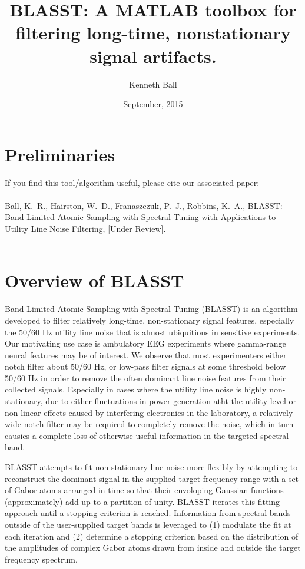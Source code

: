 \documentclass[11pt]{article}
\title{BLASST: A MATLAB toolbox for filtering long-time, nonstationary signal artifacts.}
\author{Kenneth Ball}
\date{September, 2015}
\theoremstyle{remark}
\begin{document}
\maketitle

\section*{Preliminaries}
If you find this tool/algorithm useful, please cite our associated paper: \\ \ \\

\noindent Ball, K.~R., Hairston, W.~D., Franaszczuk, P.~J., Robbins, K.~A., BLASST: Band Limited Atomic Sampling with Spectral Tuning with Applications to Utility Line Noise Filtering, [Under Review]. \\ \ \\

\section{Overview of BLASST}
Band Limited Atomic Sampling with Spectral Tuning (BLASST) is an algorithm developed to filter relatively long-time, non-stationary signal features, especially the 50/60 Hz utility line noise that is almost ubiquitious in sensitive experiments. Our motivating use case is ambulatory EEG experiments where gamma-range neural features may be of interest. We observe that most experimenters either notch filter about 50/60 Hz, or low-pass filter signals at some threshold below 50/60 Hz in order to remove the often dominant line noise features from their collected signals. Especially in cases where the utility line noise is highly non-stationary, due to either fluctuations in power generation atht the utility level or non-linear effects caused by interfering electronics in the laboratory, a relatively wide notch-filter may be required to completely remove the noise, which in turn causies a complete loss of otherwise useful information in the targeted spectral band.

BLASST attempts to fit non-stationary line-noise more flexibly by attempting to reconstruct the dominant signal in the supplied target frequency range with a set of Gabor atoms arranged in time so that their envoloping Gaussian functions (approximately) add up to a partition of unity. BLASST iterates this fitting approach until a stopping criterion is reached. Information from spectral bands outside of the user-supplied target bands is leveraged to (1) modulate the fit at each iteration and (2) determine a stopping criterion based on the distribution of the amplitudes of complex Gabor atoms drawn from inside and outside the target frequency spectrum.
\end{document}
